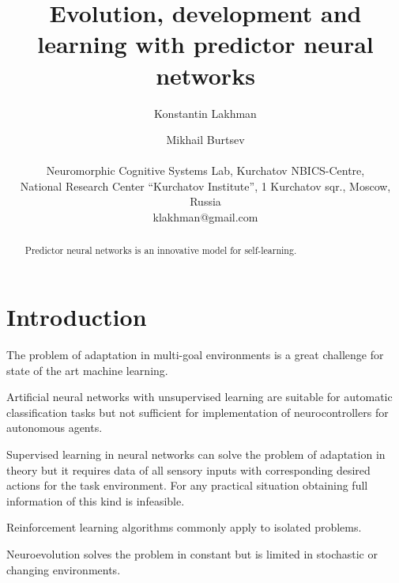 \documentclass[letterpaper]{article}
\title{Evolution, development and learning with predictor neural networks}
\author{Konstantin Lakhman \and Mikhail Burtsev \\
\mbox{}\\
Neuromorphic Cognitive Systems Lab, Kurchatov NBICS-Centre, \\
National Research Center ``Kurchatov Institute'', 1 Kurchatov sqr., Moscow, Russia \\
klakhman@gmail.com}
\begin{document}
\maketitle

\begin{abstract}
	Predictor neural networks is an innovative model for self-learning.
\end{abstract}

\section{Introduction}
The problem of adaptation in multi-goal environments is a great challenge for state of the art machine learning. 

Artificial neural networks with unsupervised learning are suitable for automatic classification tasks but not sufficient for implementation of neurocontrollers for autonomous agents.

Supervised learning in neural networks can solve the problem of adaptation in theory but it requires data of all sensory inputs with corresponding desired actions for the task environment. For any practical situation obtaining full information of this kind is infeasible.

Reinforcement learning algorithms commonly apply to isolated problems.

Neuroevolution solves the problem in constant but is limited in stochastic or changing environments.
\end{document}
